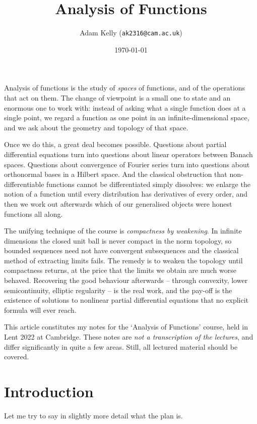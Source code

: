 \documentclass[a4paper]{scrartcl}
\title{Analysis of Functions}
\author{Adam Kelly (\texttt{ak2316@cam.ac.uk})}
\date{\today}
\begin{document}
\maketitle

Analysis of functions is the study of \emph{spaces} of functions, and of the operations that act on them. The change of viewpoint is a small one to state and an enormous one to work with: instead of asking what a single function does at a single point, we regard a function as one point in an infinite-dimensional space, and we ask about the geometry and topology of that space.

Once we do this, a great deal becomes possible. Questions about partial differential equations turn into questions about linear operators between Banach spaces. Questions about convergence of Fourier series turn into questions about orthonormal bases in a Hilbert space. And the classical obstruction that non-differentiable functions cannot be differentiated simply dissolves: we enlarge the notion of a function until every distribution has derivatives of every order, and then we work out afterwards which of our generalised objects were honest functions all along.

The unifying technique of the course is \emph{compactness by weakening}. In infinite dimensions the closed unit ball is never compact in the norm topology, so bounded sequences need not have convergent subsequences and the classical method of extracting limits fails. The remedy is to weaken the topology until compactness returns, at the price that the limits we obtain are much worse behaved. Recovering the good behaviour afterwards -- through convexity, lower semicontinuity, elliptic regularity -- is the real work, and the pay-off is the existence of solutions to nonlinear partial differential equations that no explicit formula will ever reach.

This article constitutes my notes for the `Analysis of Functions' course, held in Lent 2022 at Cambridge. These notes are \emph{not a transcription of the lectures}, and differ significantly in quite a few areas. Still, all lectured material should be covered.

\tableofcontents

\section{Introduction}

Let me try to say in slightly more detail what the plan is.
\end{document}
